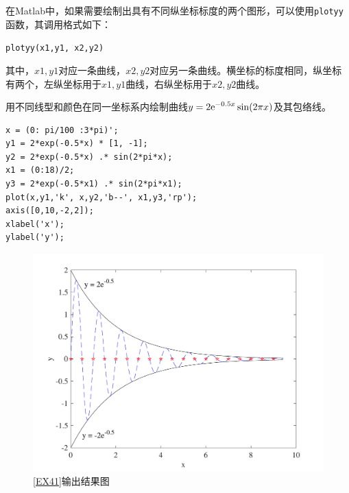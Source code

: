在Matlab中，如果需要绘制出具有不同纵坐标标度的两个图形，可以使用\lstinline|plotyy|函数，其调用格式如下：
\begin{center}
	\lstinline|plotyy(x1,y1, x2,y2)|
\end{center}
其中，$x1,y1$对应一条曲线，$x2,y2$对应另一条曲线。横坐标的标度相同，纵坐标有两个，左纵坐标用于$x1,y1$曲线，右纵坐标用于$x2,y2$曲线。

\examples\label{EX41} 用不同线型和颜色在同一坐标系内绘制曲线$\displaystyle y = 2 {\rm{e}}^{-0.5x} \sin(2\pi x)$及其包络线。
\begin{lstlisting}
x = (0: pi/100 :3*pi)';
y1 = 2*exp(-0.5*x) * [1, -1];
y2 = 2*exp(-0.5*x) .* sin(2*pi*x);
x1 = (0:18)/2;
y3 = 2*exp(-0.5*x1) .* sin(2*pi*x1);
plot(x,y1,'k', x,y2,'b--', x1,y3,'rp');
axis([0,10,-2,2]);
xlabel('x');
ylabel('y');
\end{lstlisting}
\vspace*{-1.5em}
\begin{figure}[!htb]
	\centering
	\includegraphics[width=0.7\linewidth]{pic/绘图1.pdf}
	\vspace*{-1.5em}
	\caption{\ref{EX41}输出结果图}
\end{figure}

